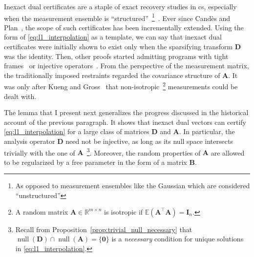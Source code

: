 Inexact dual certificates are a staple of exact recovery studies in \acrlong{cs}, especially when the measurement ensemble is ``structured''~\footnote{As opposed to measurement ensembles like the Gaussian which are considered ``unstructured''}~\cite{adcock2017,boyer2019,candes2011b}. Ever since Cand\`es and Plan~\cite{candes2011b}, the scope of such certificates has been incrementally extended. Using the form of \eqref{eq:l1_interpolation} as a template, we can say that inexact dual certificates were initially shown to exist  only when the sparsifying transform $\mathbf{D}$ was the identity. Then, other proofs started admitting programs with tight frames~\cite{candes2011} or injective operators~\cite{lee2018}. From the perspective of the measurement matrix, the traditionally imposed restraints regarded the covariance structure of $\mathbf{A}$. It was only after Kueng and Gross~\cite{kueng2014} that non-isotropic~\footnote{A random matrix $\mathbf{A} \in \mathbb{R}^{m \times n}$ is isotropic if $\mathbb{E} \left ( \mathbf{A}^\top \mathbf{A}\right ) = \mathbf{I}_{n}$.} measurements could be dealt with.

The lemma that I present next generalizes the progress discussed in the historical account of the previous paragraph. It shows that inexact dual vectors can certify \eqref{eq:l1_interpolation} for a large class of matrices $\mathbf{D}$ and $\mathbf{A}$. In particular, the analysis operator $\mathbf{D}$ need not be injective, as long as its null space intersects trivially with the one of $\mathbf{A}$~\footnote{Recall from Proposition~\ref{prop:trivial_null_necessary} that $\operatorname{null} \left ( \mathbf{D} \right ) \cap \operatorname{null} \left ( \mathbf{A} \right ) = \{ \mathbf{0} \}$ is a \emph{necessary} condition for unique solutions in \eqref{eq:l1_interpolation}.}. Moreover, the random properties of $\mathbf{A}$ are allowed to be regularized by a free parameter in the form of a matrix $\mathbf{B}$.

